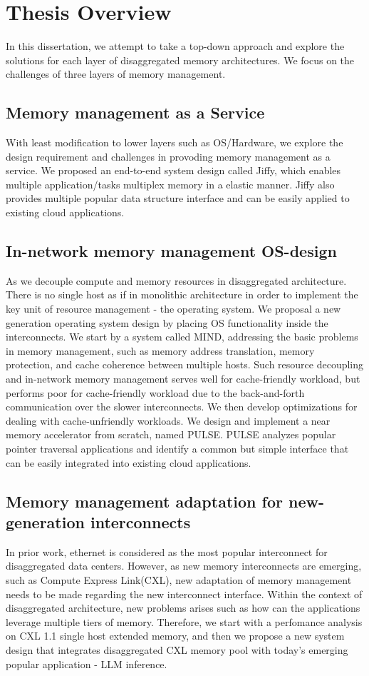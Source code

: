 \section{Thesis Overview}

In this dissertation, we attempt to take a top-down approach and explore the solutions for each layer of disaggregated memory architectures. We focus on the challenges of three layers of memory management.

\subsection{Memory management as a Service}
With least modification to lower layers such as OS/Hardware, we explore the design requirement and challenges in provoding memory management as a service. We proposed an end-to-end system design called Jiffy, which enables multiple application/tasks multiplex memory in a elastic manner. Jiffy also provides multiple popular data structure interface and can be easily applied to existing cloud applications.
\subsection{In-network memory management OS-design}
As we decouple compute and memory resources in disaggregated architecture. There is no single host as if in monolithic architecture in order to implement the key unit of resource management - the operating system. We proposal a new generation operating system design by placing OS functionality inside the interconnects. We start by a system called MIND, addressing the basic problems in memory management, such as memory address translation, memory protection, and cache coherence between multiple hosts. Such resource decoupling and in-network memory management serves well for cache-friendly workload, but performs poor for cache-friendly workload due to the back-and-forth communication over the slower interconnects. We then develop optimizations for dealing with cache-unfriendly workloads. We design and implement a near memory accelerator from scratch, named PULSE. PULSE analyzes popular pointer traversal applications and identify a common but simple interface that can be easily integrated into existing cloud applications.
\subsection{Memory management adaptation for new-generation interconnects}
In prior work, ethernet is considered as the most popular interconnect for disaggregated data centers. However, as new memory interconnects are emerging, such as Compute Express Link(CXL), new adaptation of memory management needs to be made regarding the new interconnect interface. Within the context of disaggregated architecture, new problems arises such as how can the applications leverage multiple tiers of memory. Therefore, we start with a perfomance analysis on CXL 1.1 single host extended memory, and then we propose a new system design that integrates disaggregated CXL memory pool with today's emerging popular application - LLM inference.

